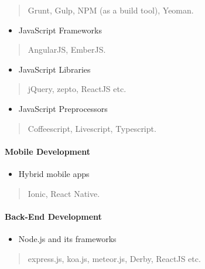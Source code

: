 \documentclass[]{article}
\providecommand{\tightlist}{%
  \setlength{\itemsep}{0pt}\setlength{\parskip}{0pt}}
\let\oldparagraph\paragraph
\renewcommand{\paragraph}[1]{\oldparagraph{#1}\mbox{}}
\begin{document}
\begin{quote}
Grunt, Gulp, NPM (as a build tool), Yeoman.
\end{quote}

\begin{itemize}
\tightlist
\item
  JavaScript Frameworks
\end{itemize}

\begin{quote}
AngularJS, EmberJS.
\end{quote}

\begin{itemize}
\tightlist
\item
  JavaScript Libraries
\end{itemize}

\begin{quote}
jQuery, zepto, ReactJS etc.
\end{quote}

\begin{itemize}
\tightlist
\item
  JavaScript Preprocessors
\end{itemize}

\begin{quote}
Coffeescript, Livescript, Typescript.
\end{quote}

\paragraph{Mobile Development}\label{mobile-development}

\begin{itemize}
\tightlist
\item
  Hybrid mobile apps
\end{itemize}

\begin{quote}
Ionic, React Native.
\end{quote}

\paragraph{Back-End Development}\label{back-end-development}

\begin{itemize}
\tightlist
\item
  Node.js and its frameworks
\end{itemize}

\begin{quote}
express.js, koa.js, meteor.js, Derby, ReactJS etc.
\end{quote}
\end{document}

